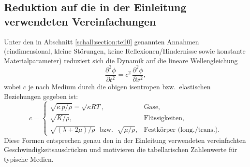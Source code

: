 \begin{comment}
\paragraph{Interpretation}
\begin{itemize}
  \item $c_L$ hängt von \emph{Volumensteifigkeit} ab: $(\lambda+2\mu)$ skaliert den Widerstand gegen Volumenänderung (\emph{Druck-/Kompressionswelle}).
  \item $c_T$ hängt allein von der \emph{Schersteifigkeit} $\mu$ ab (\emph{Scherwelle}); in Fluiden ist $\mu\approx 0$, daher keine Transversalwellen.
\end{itemize}

Somit erhält man in isotropen Medien zwei Wellengeschwindigkeiten \cite{schall:landaulifschitz,schall:gurtin}:
\begin{align}
    \boxed{\,c_T=\sqrt{\frac{\mu}{\rho}}=\sqrt{\frac{G}{\rho}}\,} \quad &\text{(transversal, Scherwellen)},\\[2mm]
    \boxed{\,c_L=\sqrt{\frac{\lambda+2\mu}{\rho}}\,} \quad &\text{(longitudinal, Druckwellen)}.
\end{align}
In technischen Materialparametern, sprich Elastizitätsmodul $E$ und Poissonzahl $\nu$, mit
\[
    \mu=G=\frac{E}{2(1+\nu)},
    \qquad
    \lambda=\frac{E\,\nu}{(1+\nu)(1-2\nu)},
\]
ergeben sich die in der Einleitung verwendeten Ausdrücke
\begin{align}
    \boxed{\,c_{s,\mathrm{long}}
    = \sqrt{\frac{E(1-\nu)}{\rho(1+\nu)(1-2\nu)}}\,},\qquad
    \boxed{\,c_{s,\mathrm{trans}}
    = \sqrt{\frac{E}{2\rho(1+\nu)}}=\sqrt{\frac{G}{\rho}}\,}.
\end{align}
Typisch ist $c_L>c_T$, und beide liegen deutlich über Gas- und Flüssigkeitswerten (z.\,B. Stahl $c\approx 5{,}0\text{--}5{,}9\,\mathrm{km/s}$ für Longitudinalwellen, je nach Legierung).

\end{comment}

\subsection{Reduktion auf die in der Einleitung verwendeten Vereinfachungen}
Unter den in Abschnitt \ref{schall:section:teil0} genannten Annahmen (eindimensional,
kleine Störungen, keine Reflexionen/Hindernisse sowie konstante
Materialparameter) reduziert sich die Dynamik auf die lineare
Wellengleichung
\[
    \frac{\partial^2 \phi}{\partial t^2}=c^2\,\frac{\partial^2 \phi}{\partial x^2},
\]
wobei $c$ je nach Medium durch die obigen isentropen bzw.\ elastischen
Beziehungen gegeben ist:
\[
    c=\begin{cases}
    \sqrt{\kappa\,p/\rho}=\sqrt{\kappa R T}, & \text{Gase},\\[1mm]
    \sqrt{K/\rho}, & \text{Flüssigkeiten},\\[1mm]
    \sqrt{(\lambda+2\mu)/\rho}\;\text{ bzw. }\;\sqrt{\mu/\rho}, & \text{Festkörper (long./trans.)}.
\end{cases}
\]
Diese Formen entsprechen genau den in der Einleitung verwendeten
vereinfachten Geschwindigkeitsausdrücken und motivieren die
tabellarischen Zahlenwerte für typische Medien.
